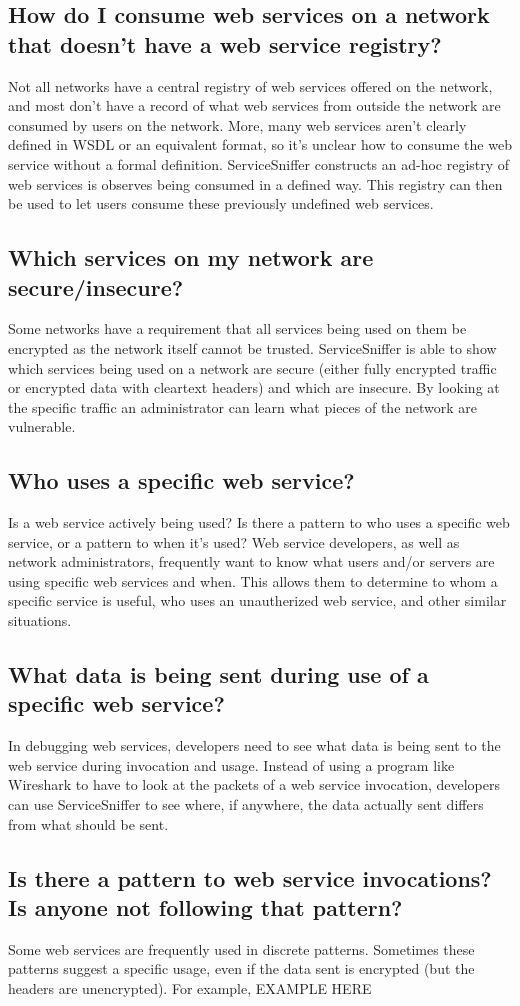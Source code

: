 \subsection*{How do I consume web services on a network that doesn't have a web
             service registry?}
Not all networks have a central registry of web services offered on the
network, and most don't have a record of what web services from outside the
network are consumed by users on the network.  More, many web services aren't
clearly defined in WSDL or an equivalent format, so it's unclear how to consume
the web service without a formal definition.  ServiceSniffer constructs an
ad-hoc registry of web services is observes being consumed in a defined way.
This registry can then be used to let users consume these previously undefined
web services.


\subsection*{Which services on my network are secure/insecure?}
Some networks have a requirement that all services being used on them be
encrypted as the network itself cannot be trusted.  ServiceSniffer is able to
show which services being used on a network are secure (either fully encrypted
traffic or encrypted data with cleartext headers) and which are insecure.  By
looking at the specific traffic an administrator can learn what pieces of the
network are vulnerable.


\subsection*{Who uses a specific web service?}
Is a web service actively being used?  Is there a pattern to who uses a
specific web service, or a pattern to when it's used?  Web service developers,
as well as network administrators, frequently want to know what users and/or
servers are using specific web services and when.  This allows them to
determine to whom a specific service is useful, who uses an unautherized web
service, and other similar situations.


\subsection*{What data is being sent during use of a specific web service?}
In debugging web services, developers need to see what data is being sent to
the web service during invocation and usage.  Instead of using a program like
Wireshark to have to look at the packets of a web service invocation,
developers can use ServiceSniffer to see where, if anywhere, the data actually
sent differs from what should be sent.

\subsection*{Is there a pattern to web service invocations?  Is anyone not
             following that pattern?}
Some web services are frequently used in discrete patterns.  Sometimes these
patterns suggest a specific usage, even if the data sent is encrypted (but the
headers are unencrypted).  For example, EXAMPLE HERE

